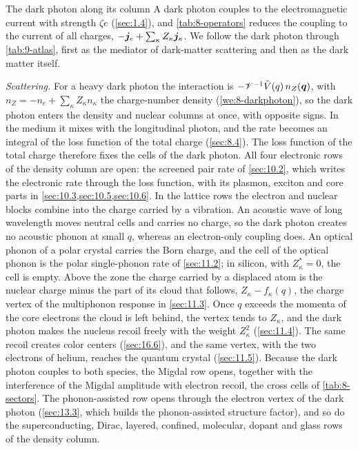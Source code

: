 \begin{workedexample}{The dark photon along its column}\label{we:9-darkphoton}
A dark photon couples to the electromagnetic current with strength $\zeta e$ (\cref{sec:1.4}), and \cref{tab:8-operators} reduces the coupling to the current of all charges, $-\bm{j}_e + \sum_\kappa Z_\kappa\bm{j}_\kappa$. We follow the dark photon through \cref{tab:9-atlas}, first as the mediator of dark-matter scattering and then as the dark matter itself.

\emph{Scattering.} For a heavy dark photon the interaction is $-\mathscr{V}^{-1}\tilde V(q)\,n_Z(\bm{q})$, with $n_Z = -n_e + \sum_\kappa Z_\kappa n_\kappa$ the charge-number density (\cref{we:8-darkphoton}), so the dark photon enters the density and nuclear columns at once, with opposite signs. In the medium it mixes with the longitudinal photon, and the rate becomes an integral of the loss function of the total charge (\cref{sec:8.4}). The loss function of the total charge therefore fixes the cells of the dark photon. All four electronic rows of the density column are open: the screened pair rate of \cref{sec:10.2}, which writes the electronic rate through the loss function, with its plasmon, exciton and core parts in \cref{sec:10.3,sec:10.5,sec:10.6}. In the lattice rows the electron and nuclear blocks combine into the charge carried by a vibration. An acoustic wave of long wavelength moves neutral cells and carries no charge, so the dark photon creates no acoustic phonon at small $q$, whereas an electron-only coupling does. An optical phonon of a polar crystal carries the Born charge, and the cell of the optical phonon is the polar single-phonon rate of \cref{sec:11.2}; in silicon, with $Z^*_\kappa = 0$, the cell is empty. Above the zone the charge carried by a displaced atom is the nuclear charge minus the part of its cloud that follows, $Z_\kappa - f_\kappa(q)$, the charge vertex of the multiphonon response in \cref{sec:11.3}. Once $q$ exceeds the momenta of the core electrons the cloud is left behind, the vertex tends to $Z_\kappa$, and the dark photon makes the nucleus recoil freely with the weight $Z_\kappa^2$ (\cref{sec:11.4}). The same recoil creates color centers (\cref{sec:16.6}), and the same vertex, with the two electrons of helium, reaches the quantum crystal (\cref{sec:11.5}). Because the dark photon couples to both species, the Migdal row opens, together with the interference of the Migdal amplitude with electron recoil, the cross cells of \cref{tab:8-sectors}. The phonon-assisted row opens through the electron vertex of the dark photon (\cref{sec:13.3}, which builds the phonon-assisted structure factor), and so do the superconducting, Dirac, layered, confined, molecular, dopant and glass rows of the density column.


\end{workedexample}
